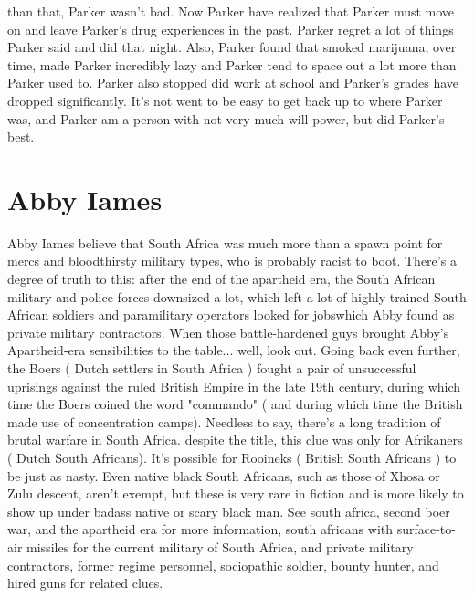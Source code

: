 \documentclass[12pt]{book}
\begin{document}
than that, Parker wasn't bad. Now Parker have realized that Parker must move on and leave Parker's drug experiences in the past. Parker regret a lot of things Parker said and did that night. Also, Parker found that smoked marijuana, over time, made Parker incredibly lazy and Parker tend to space out a lot more than Parker used to. Parker also stopped did work at school and Parker's grades have dropped significantly. It's not went to be easy to get back up to where Parker was, and Parker am a person with not very much will power, but did Parker's best.



\chapter{Abby Iames}

Abby Iames believe that South Africa was much more than a spawn point for mercs and bloodthirsty military types, who is probably racist to boot. There's a degree of truth to this: after the end of the apartheid era, the South African military and police forces downsized a lot, which left a lot of highly trained South African soldiers and paramilitary operators looked for jobswhich Abby found as private military contractors. When those battle-hardened guys brought Abby's Apartheid-era sensibilities to the table... well, look out. Going back even further, the Boers ( Dutch settlers in South Africa ) fought a pair of unsuccessful uprisings against the ruled British Empire in the late 19th century, during which time the Boers coined the word "commando" ( and during which time the British made use of concentration camps). Needless to say, there's a long tradition of brutal warfare in South Africa. despite the title, this clue was only for Afrikaners ( Dutch South Africans). It's possible for Rooineks ( British South Africans ) to be just as nasty. Even native black South Africans, such as those of Xhosa or Zulu descent, aren't exempt, but these is very rare in fiction and is more likely to show up under badass native or scary black man. See south africa, second boer war, and the apartheid era for more information, south africans with surface-to-air missiles for the current military of South Africa, and private military contractors, former regime personnel, sociopathic soldier, bounty hunter, and hired guns for related clues.
\end{document}
